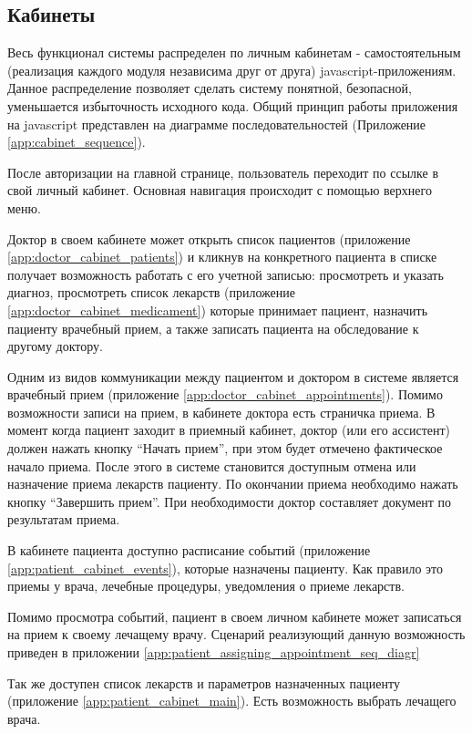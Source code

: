 \subsection{Кабинеты}
Весь функционал системы распределен по личным кабинетам - самостоятельным
(реализация каждого модуля независима друг от друга) javascript-приложениям.
Данное распределение позволяет сделать систему понятной, безопасной, уменьшается
избыточность исходного кода. Общий принцип работы приложения на javascript
представлен на диаграмме последовательностей (Приложение
\ref{app:cabinet_sequence}).

После авторизации на главной странице, пользователь переходит по ссылке в свой
личный кабинет. Основная навигация происходит с помощью верхнего меню.

Доктор в своем кабинете может открыть список пациентов (приложение
\ref{app:doctor_cabinet_patients}) и кликнув на конкретного пациента в списке
получает возможность работать с его учетной записью:
просмотреть и указать диагноз, просмотреть список лекарств (приложение
\ref{app:doctor_cabinet_medicament}) которые принимает пациент, назначить
пациенту врачебный прием, а также записать пациента на обследование к другому
доктору.

Одним из видов коммуникации между пациентом и доктором в системе является
врачебный прием (приложение \ref{app:doctor_cabinet_appointments}). Помимо
возможности записи на прием, в кабинете доктора есть страничка приема. В момент
когда пациент заходит в приемный кабинет, доктор (или его ассистент) должен
нажать кнопку “Начать прием”, при этом будет отмечено фактическое начало приема.
После этого в системе становится доступным отмена или назначение приема лекарств
пациенту. По окончании приема необходимо нажать кнопку “Завершить прием”. При
необходимости доктор составляет документ по результатам приема.

В кабинете пациента доступно расписание событий (приложение
\ref{app:patient_cabinet_events}), которые назначены пациенту.
Как правило это приемы у врача, лечебные процедуры, уведомления о приеме
лекарств.

Помимо просмотра событий, пациент в своем личном кабинете может записаться на
прием к своему лечащему врачу. Сценарий реализующий данную возможность приведен
в приложении \ref{app:patient_assigning_appointment_seq_diagr}

Так же доступен список лекарств и параметров назначенных пациенту (приложение
\ref{app:patient_cabinet_main}).
Есть возможность выбрать лечащего врача.

